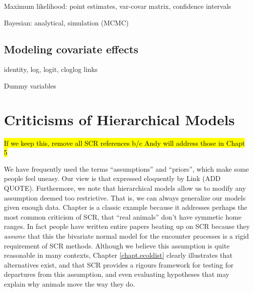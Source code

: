 Maximum likelihood: point estimates, var-covar matrix, confidence
intervals

Bayesian: analytical, simulation (MCMC)




\subsection{Modeling covariate effects}

identity, log, logit, cloglog links


Dummy variables





\section{Criticisms of Hierarchical Models}

\hl{If we keep this, remove all SCR references b/c Andy will address
  those in Chapt 5}

We have frequently used the terms
``assumptions'' and ``priors'', which make some people feel
uneasy. Our view is that expressed eloquently by Link (ADD
QUOTE). Furthermore, we note that hierarchical models allow us to
modify any assumption deemed too
restrictive. That is, we can always generalize our models given enough
data. Chapter is a classic example because it addresses
perhaps the most common criticism of SCR, that ``real animals'' don't
have symmetic home ranges. In fact people have written entire papers
beating up on SCR because they \emph{assume} that this the bivariate
normal model for the encounter processes is a rigid requirement of SCR
methods. Although we believe this assumption is quite reasonable in
many contexts, Chapter \ref{chapt.ecoldist} clearly illustrates that
alternatives exist, and that SCR provides a rigours framework for
testing for departures from this assumption, and even evaluating
hypotheses that may explain why animals move the way they do.


